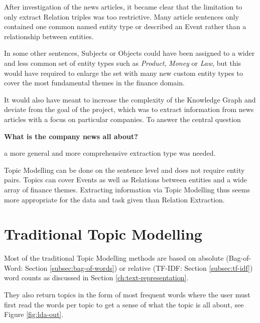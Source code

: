 After investigation of the news articles, it became clear that the limitation to only extract Relation triples was too restrictive.
Many article sentences only contained one common named entity type or described an Event rather than a relationship between entities.

In some other sentences, Subjects or Objects could have been assigned to a wider and less common set of entity types such as \emph{Product}, \emph{Money} or \emph{Law},
but this would have required to enlarge the set with many new custom entity types to cover the most fundamental themes in the finance domain.

It would also have meant to increase the complexity of the Knowledge Graph and deviate from the goal of the project, which was
to extract information from news articles with a focus on particular companies.
To answer the central question
\begin{center}
    \textbf{What is the company news all about?}
\end{center}
a more general and more comprehensive extraction type was needed.


Topic Modelling can be done on the sentence level and does not require entity pairs.
Topics can cover Events as well as Relations between entities and a wide array of finance themes.
Extracting information via Topic Modelling thus seems more appropriate for the data and task given than Relation Extraction.

\section{Traditional Topic Modelling}\label{sec:traditional_approaches}
Most of the traditional Topic Modelling methods are based on absolute (Bag-of-Word: Section \ref{subsec:bag-of-words}) or relative (TF-IDF: Section \ref{subsec:tf-idf}) word counts as discussed in Section \ref{ch:text-representation}.

They also return topics in the form of most frequent words where the user must first read the words per topic to get a sense of what the topic is all about, see Figure \ref{fig:lda-out}.

